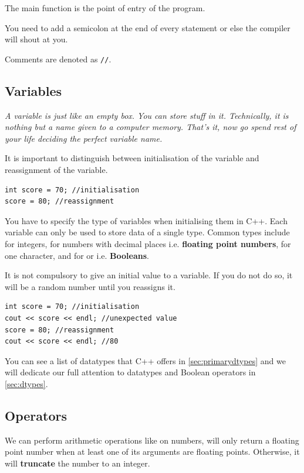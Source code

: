 The main function is the point of entry of the program.

You need to add a semicolon at the end of every statement or else the compiler will shout at you. 

Comments are denoted as \texttt{//}.

\subsection*{Variables}

\textit{A variable is just like an empty box. You can store stuff in it. Technically, it is nothing but a name given to a computer memory. That's it, now go spend rest of your life deciding the perfect variable name.} 

It is important to distinguish between initialisation of the variable and reassignment of the variable.

\begin{lstlisting}
int score = 70; //initialisation
score = 80; //reassignment
\end{lstlisting}

You have to specify the type of variables when initialising them in C++. Each variable can only be used to store data of a single type. Common types include  for integers,  for numbers with decimal places i.e. \textbf{floating point numbers},  for one character, and  for  or  i.e. \textbf{Booleans}. 

It is not compulsory to give an initial value to a variable. If you do not do so, it will be a random number until you reassigns it.

\begin{lstlisting}
int score = 70; //initialisation
cout << score << endl; //unexpected value
score = 80; //reassignment
cout << score << endl; //80
\end{lstlisting}

You can see a list of datatypes that C++ offers in \cref{sec:primarydtypes} and we will dedicate our full attention to datatypes and Boolean operators in \cref{sec:dtypes}.

\subsection*{Operators}
We can perform arithmetic operations like \code{+ - * /} on numbers, \code{/} will only return a floating point number when at least one of its arguments are floating points. Otherwise, it will \textbf{truncate} the number to an integer. %

